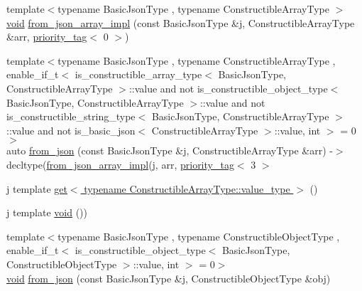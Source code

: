 \begin{DoxyCompactItemize}
{\footnotesize template$<$typename Basic\+Json\+Type , typename Constructible\+Array\+Type $>$ }\\\hyperlink{namespacenlohmann_1_1detail_a59fca69799f6b9e366710cb9043aa77d}{void} \hyperlink{namespacenlohmann_1_1detail_a20cf21255e75cff1ffb0869c2c545e63}{from\+\_\+json\+\_\+array\+\_\+impl} (const Basic\+Json\+Type \&j, Constructible\+Array\+Type \&arr, \hyperlink{structnlohmann_1_1detail_1_1priority__tag}{priority\+\_\+tag}$<$ 0 $>$)
\item 
{\footnotesize template$<$typename Basic\+Json\+Type , typename Constructible\+Array\+Type , enable\+\_\+if\+\_\+t$<$ is\+\_\+constructible\+\_\+array\+\_\+type$<$ Basic\+Json\+Type, Constructible\+Array\+Type $>$\+::value and not is\+\_\+constructible\+\_\+object\+\_\+type$<$ Basic\+Json\+Type, Constructible\+Array\+Type $>$\+::value and not is\+\_\+constructible\+\_\+string\+\_\+type$<$ Basic\+Json\+Type, Constructible\+Array\+Type $>$\+::value and not is\+\_\+basic\+\_\+json$<$ Constructible\+Array\+Type $>$\+::value, int $>$  = 0$>$ }\\auto \hyperlink{namespacenlohmann_1_1detail_a14d8cdf544585f1c38eab6a0820e55f7}{from\+\_\+json} (const Basic\+Json\+Type \&j, Constructible\+Array\+Type \&arr) -\/$>$ decltype(\hyperlink{namespacenlohmann_1_1detail_a40f7bb070a60e8ba14fffb9c117fcbd8}{from\+\_\+json\+\_\+array\+\_\+impl}(j, arr, \hyperlink{structnlohmann_1_1detail_1_1priority__tag}{priority\+\_\+tag}$<$ 3 $>$
\item 
j template \hyperlink{namespacenlohmann_1_1detail_ad9e016d7b6a3cd2847027950aa0aac3b}{get$<$ typename Constructible\+Array\+Type\+::value\+\_\+type $>$} ()
\item 
j template \hyperlink{namespacenlohmann_1_1detail_a59fca69799f6b9e366710cb9043aa77d}{void} ())
\item 
{\footnotesize template$<$typename Basic\+Json\+Type , typename Constructible\+Object\+Type , enable\+\_\+if\+\_\+t$<$ is\+\_\+constructible\+\_\+object\+\_\+type$<$ Basic\+Json\+Type, Constructible\+Object\+Type $>$\+::value, int $>$  = 0$>$ }\\\hyperlink{namespacenlohmann_1_1detail_a59fca69799f6b9e366710cb9043aa77d}{void} \hyperlink{namespacenlohmann_1_1detail_a5b24896e5f5db6af06d939dde4b63fe1}{from\+\_\+json} (const Basic\+Json\+Type \&j, Constructible\+Object\+Type \&obj)
\item 

\end{DoxyCompactItemize}
